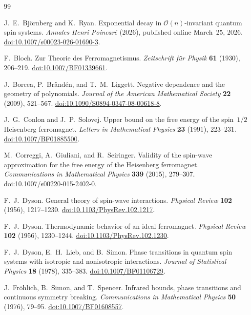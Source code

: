 \begin{thebibliography}{99}

J.~E.~Bj\"ornberg and K.~Ryan.
Exponential decay in \(\mathcal O(n)\)-invariant quantum spin systems.
\emph{Annales Henri Poincar\'e} (2026), published online March~25, 2026.
\href{https://doi.org/10.1007/s00023-026-01690-3}{doi:10.1007/s00023-026-01690-3}.

F.~Bloch.
Zur Theorie des Ferromagnetismus.
\emph{Zeitschrift f\"ur Physik} \textbf{61} (1930), 206--219.
\href{https://doi.org/10.1007/BF01339661}{doi:10.1007/BF01339661}.

J.~Borcea, P.~Br\"and\'en, and T.~M.~Liggett.
Negative dependence and the geometry of polynomials.
\emph{Journal of the American Mathematical Society}
\textbf{22} (2009), 521--567.
\href{https://doi.org/10.1090/S0894-0347-08-00618-8}{doi:10.1090/S0894-0347-08-00618-8}.

J.~G.~Conlon and J.~P.~Solovej.
Upper bound on the free energy of the spin~\(1/2\) Heisenberg ferromagnet.
\emph{Letters in Mathematical Physics} \textbf{23} (1991), 223--231.
\href{https://doi.org/10.1007/BF01885500}{doi:10.1007/BF01885500}.

M.~Correggi, A.~Giuliani, and R.~Seiringer.
Validity of the spin-wave approximation for the free energy of the
Heisenberg ferromagnet.
\emph{Communications in Mathematical Physics} \textbf{339} (2015), 279--307.
\href{https://doi.org/10.1007/s00220-015-2402-0}{doi:10.1007/s00220-015-2402-0}.

F.~J.~Dyson.
General theory of spin-wave interactions.
\emph{Physical Review} \textbf{102} (1956), 1217--1230.
\href{https://doi.org/10.1103/PhysRev.102.1217}{doi:10.1103/PhysRev.102.1217}.

F.~J.~Dyson.
Thermodynamic behavior of an ideal ferromagnet.
\emph{Physical Review} \textbf{102} (1956), 1230--1244.
\href{https://doi.org/10.1103/PhysRev.102.1230}{doi:10.1103/PhysRev.102.1230}.

F.~J.~Dyson, E.~H.~Lieb, and B.~Simon.
Phase transitions in quantum spin systems with isotropic and nonisotropic
interactions.
\emph{Journal of Statistical Physics} \textbf{18} (1978), 335--383.
\href{https://doi.org/10.1007/BF01106729}{doi:10.1007/BF01106729}.

J.~Fr\"ohlich, B.~Simon, and T.~Spencer.
Infrared bounds, phase transitions and continuous symmetry breaking.
\emph{Communications in Mathematical Physics} \textbf{50} (1976), 79--95.
\href{https://doi.org/10.1007/BF01608557}{doi:10.1007/BF01608557}.


\end{thebibliography}
